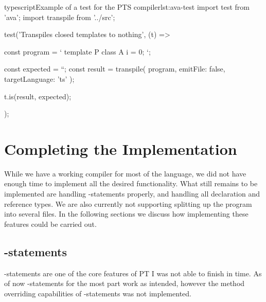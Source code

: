 \begin{code}{typescript}{Example of a test for the PTS compiler}{lst:ava-test}
    import test from 'ava';
    import transpile from '../src';

    test('Transpiles closed templates to nothing', (t) => {
        const program = `
    template P {
        class A {
            i = 0;
        }
    }
    `;

        const expected = ``;
        const result = transpile(
            program,
            { emitFile: false, targetLanguage: 'ts' }
        );

        t.is(result, expected);
    });
\end{code}

\section{Completing the Implementation}\label{sec:completing-the-implementation}

While we have a working compiler for most of the language, we did not have enough time to implement all the desired functionality.
What still remains to be implemented are handling -statements properly, and handling all declaration and reference types.
We are also currently not supporting splitting up the program into several files.
In the following sections we discuss how implementing these features could be carried out.

\subsection{-statements}\label{subsec:addto-statements}

-statements are one of the core features of PT I was not able to finish in time.
As of now -statements for the most part work as intended, however the method overriding capabilities of -statements was not implemented.

